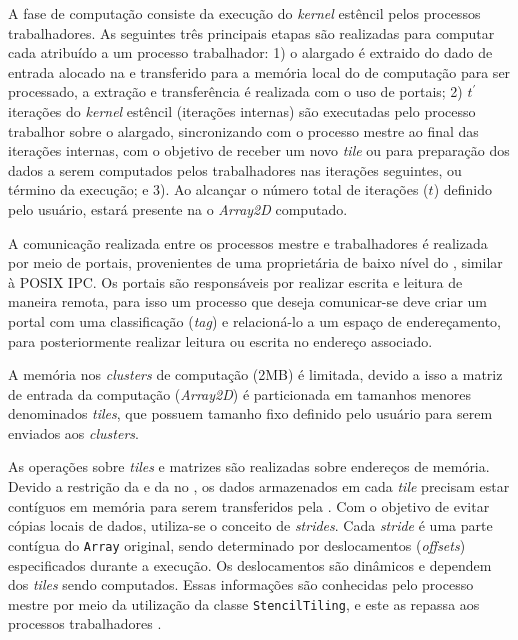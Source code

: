 A fase de computação consiste da execução do \emph{kernel} estêncil pelos processos trabalhadores. As seguintes três principais etapas são realizadas para computar cada \tile atribuído a um processo trabalhador: 1) o \tile alargado é extraido do dado de entrada alocado na \lpddr e transferido para a memória local do \cluster de computação para ser processado, a extração e transferência é realizada com o uso de portais; 2) $t^\prime$ iterações do \emph{kernel} estêncil (iterações internas) são executadas pelo processo trabalhor sobre o \tile alargado, sincronizando com o processo mestre ao final das iterações internas, com o objetivo de receber um novo \textit{tile} ou para preparação dos dados a serem computados pelos trabalhadores nas iterações seguintes, ou término da execução; e 3). Ao alcançar o número total de iterações ($t$) definido pelo usuário, estará presente na \lpddr o \textit{Array2D} computado.

A comunicação realizada entre os processos mestre e trabalhadores é realizada por meio de portais, provenientes de uma \api proprietária de baixo nível do \mppa, similar à POSIX IPC. Os portais são responsáveis por realizar escrita e leitura de maneira remota, para isso um processo que deseja comunicar-se deve criar um portal com uma classificação (\textit{tag}) e relacioná-lo a um espaço de endereçamento, para posteriormente realizar leitura ou escrita no endereço associado.

A memória nos \textit{clusters} de computação (2MB) é limitada, devido a isso a matriz de entrada da computação (\textit{Array2D}) é particionada em tamanhos menores denominados \textit{tiles}, que possuem tamanho fixo definido pelo usuário para serem enviados aos \textit{clusters}.

As operações sobre \textit{tiles} e matrizes são realizadas sobre endereços de memória. Devido a restrição da \api e da \noc no \mppa, os dados armazenados em cada \textit{tile} precisam estar contíguos em memória para serem transferidos
pela \noc. Com o objetivo de evitar cópias locais de dados, utiliza-se o conceito de \textit{strides}. Cada \textit{stride} é uma parte contígua do \texttt{Array} original, sendo determinado por deslocamentos (\textit{offsets}) especificados durante a
execução. Os deslocamentos são dinâmicos e dependem dos \textit{tiles} sendo computados. Essas informações são conhecidas pelo processo mestre por meio da utilização da classe \texttt{StencilTiling}, e este as repassa aos processos trabalhadores \cite{Podesta:TCC}.

